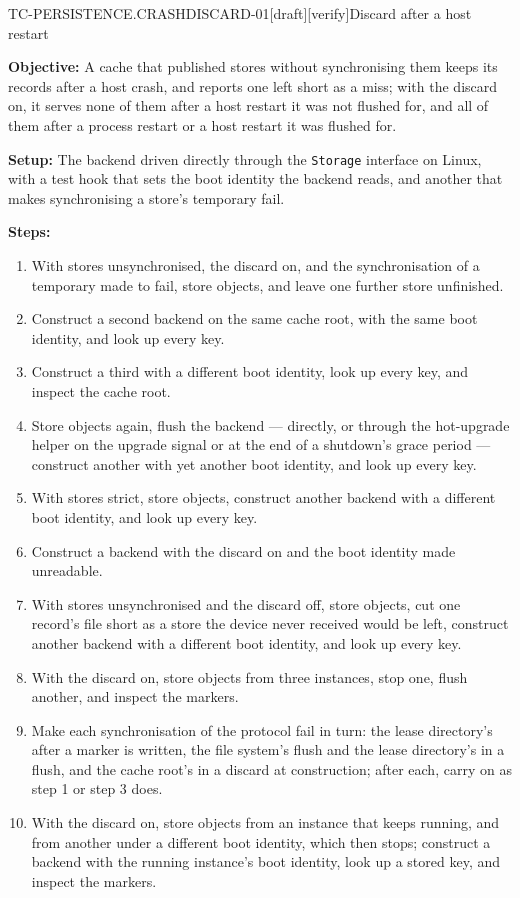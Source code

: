 \begin{requirement}{TC-PERSISTENCE.CRASHDISCARD-01}[draft][verify]{Discard after a host restart}


  \textbf{Objective:} A cache that published stores without synchronising
  them keeps its records after a host crash, and reports one left short as a
  miss; with the discard on, it serves none of them after a host restart it
  was not flushed for, and all of them after a process restart or a host
  restart it was flushed for.

  \textbf{Setup:} The backend driven directly through the \texttt{Storage}
  interface on Linux, with a test hook that sets the boot identity the
  backend reads, and another that makes synchronising a store's temporary
  fail.

  \textbf{Steps:}
  \begin{enumerate}
    \item With stores unsynchronised, the discard on, and the synchronisation
      of a temporary made to fail, store objects, and leave one further store
      unfinished.
    \item Construct a second backend on the same cache root, with the same
      boot identity, and look up every key.
    \item Construct a third with a different boot identity, look up every key,
      and inspect the cache root.
    \item Store objects again, flush the backend --- directly, or through
      the hot-upgrade helper on the upgrade signal or at the end of a
      shutdown's grace period --- construct another with yet another boot
      identity, and look up every key.
    \item With stores strict, store objects, construct another backend with a
      different boot identity, and look up every key.
    \item Construct a backend with the discard on and the boot identity made
      unreadable.
    \item With stores unsynchronised and the discard off, store objects, cut
      one record's file short as a store the device never received would be
      left, construct another backend with a different boot identity, and
      look up every key.
    \item With the discard on, store objects from three instances, stop one,
      flush another, and inspect the markers.
    \item Make each synchronisation of the protocol fail in turn: the lease
      directory's after a marker is written, the file system's flush and the
      lease directory's in a flush, and the cache root's in a discard at
      construction; after each, carry on as step 1 or step 3 does.
    \item With the discard on, store objects from an instance that keeps
      running, and from another under a different boot identity, which then
      stops; construct a backend with the running instance's boot identity,
      look up a stored key, and inspect the markers.
  \end{enumerate}


\end{requirement}
